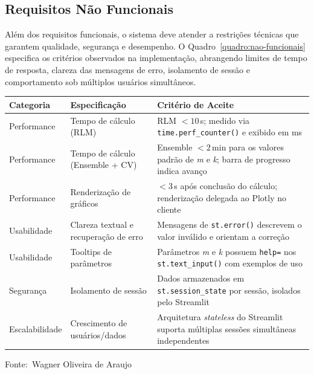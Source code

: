 \documentclass[12pt,a4paper]{article}
\newcommand{\oautor}{Wagner Oliveira de Araujo}
\begin{document}
\subsection{Requisitos Não Funcionais}

Além dos requisitos funcionais, o sistema deve atender a restrições técnicas que garantem qualidade, segurança e desempenho. O Quadro~\ref{quadro:nao-funcionais} especifica os critérios observados na implementação, abrangendo limites de tempo de resposta, clareza das mensagens de erro, isolamento de sessão e comportamento sob múltiplos usuários simultâneos.

\begin{quadro}[ht]
\centering
\small
\caption{Especificação de requisitos não funcionais}
\label{quadro:nao-funcionais}
\begin{threeparttable}
\begin{tabularx}{\textwidth}{|l|X|X|} \hline
\textbf{Categoria} & \textbf{Especificação} & \textbf{Critério de Aceite} \\ \hline
Performance & Tempo de cálculo (RLM) & RLM $< 10\,$s; medido via \texttt{time.perf\_counter()} e exibido em ms \\ \hline
Performance & Tempo de cálculo (Ensemble + CV) & Ensemble $< 2\,$min para os valores padrão de \textit{m} e \textit{k}; barra de progresso indica avanço \\ \hline
Performance & Renderização de gráficos & $< 3\,$s após conclusão do cálculo; renderização delegada ao Plotly no cliente \\ \hline
Usabilidade & Clareza textual e recuperação de erro & Mensagens de \texttt{st.error()} descrevem o valor inválido e orientam a correção \\ \hline
Usabilidade & Tooltips de parâmetros & Parâmetros \textit{m} e \textit{k} possuem \texttt{help=} nos \texttt{st.text\_input()} com exemplos de uso \\ \hline
Segurança & Isolamento de sessão & Dados armazenados em \texttt{st.session\_state} por sessão, isolados pelo Streamlit \\ \hline
Escalabilidade & Crescimento de usuários/dados & Arquitetura \textit{stateless} do Streamlit suporta múltiplas sessões simultâneas independentes \\ \hline
\end{tabularx}
\begin{tablenotes}[flushleft]
\footnotesize
\item Fonte:~\oautor
\end{tablenotes}
\end{threeparttable}
\end{quadro}
\newpage
\end{document}
